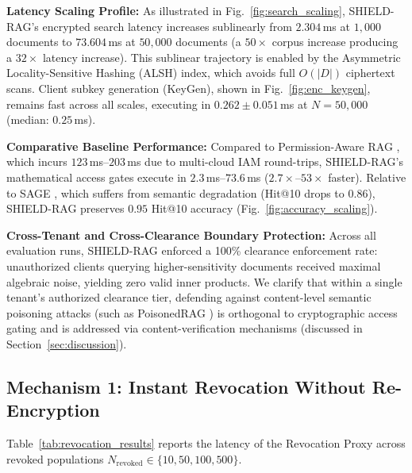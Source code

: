 \documentclass[10pt,a4paper]{article}
\begin{document}
\textbf{Latency Scaling Profile:} As illustrated in Fig.~\ref{fig:search_scaling}, SHIELD-RAG's encrypted search latency increases sublinearly from $2.304$\,ms at $1{,}000$ documents to $73.604$\,ms at $50{,}000$ documents (a $50\times$ corpus increase producing a $32\times$ latency increase). This sublinear trajectory is enabled by the Asymmetric Locality-Sensitive Hashing (ALSH) index, which avoids full $O(|D|)$ ciphertext scans. Client subkey generation (KeyGen), shown in Fig.~\ref{fig:enc_keygen}, remains fast across all scales, executing in $0.262 \pm 0.051$\,ms at $N=50{,}000$ (median: $0.25$\,ms).

\textbf{Comparative Baseline Performance:} Compared to Permission-Aware RAG \cite{jeong2025permissionaware}, which incurs $123$\,ms--$203$\,ms due to multi-cloud IAM round-trips, SHIELD-RAG's mathematical access gates execute in $2.3$\,ms--$73.6$\,ms ($2.7\times$--$53\times$ faster). Relative to SAGE \cite{zeng2025mitigating}, which suffers from semantic degradation (Hit@10 drops to $0.86$), SHIELD-RAG preserves $0.95$ Hit@10 accuracy (Fig.~\ref{fig:accuracy_scaling}).

\textbf{Cross-Tenant and Cross-Clearance Boundary Protection:} Across all evaluation runs, SHIELD-RAG enforced a 100\% clearance enforcement rate: unauthorized clients querying higher-sensitivity documents received maximal algebraic noise, yielding zero valid inner products. We clarify that within a single tenant's authorized clearance tier, defending against content-level semantic poisoning attacks (such as PoisonedRAG \cite{zou2025poisonedrag}) is orthogonal to cryptographic access gating and is addressed via content-verification mechanisms (discussed in Section~\ref{sec:discussion}).

\subsection{Mechanism 1: Instant Revocation Without Re-Encryption}
Table~\ref{tab:revocation_results} reports the latency of the Revocation Proxy across revoked populations $N_{\text{revoked}} \in \{10, 50, 100, 500\}$.
\end{document}
